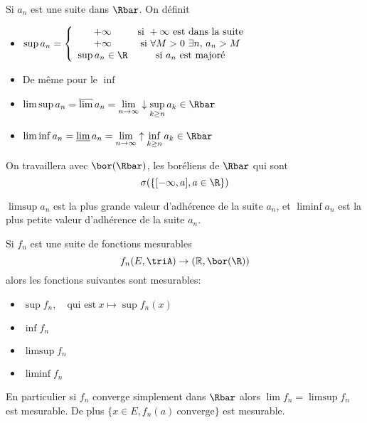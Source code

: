 \begin{definition}
	Si $a_n$ est une suite dans $\Rbar$. On définit
	\begin{itemize}
		\item $\sup a_n =
			      \left\{ \begin{array}{cc}
				      +\infty         & \text{si} \ +\infty \ \text{est dans la suite}   \\
				      +\infty         & \text{si} \ \forall M > 0 \ \exists n,\, a_n > M \\
				      \sup a_n \in \R & \text{si} \ a_n\  \text{est majoré}
			      \end{array}\right.$

		\item De même pour le $\inf$
		\item $\limsup a_n = \varlimsup a_n = \lim\limits_{n \to \infty}\downarrow \sup\limits_{k \geq n } a_k \in \Rbar$
		\item $\liminf a_n = \varliminf a_n = \lim\limits_{n \to \infty}\uparrow \inf\limits_{k \geq n } a_k \in \Rbar$
	\end{itemize}
\end{definition}


\begin{remarque}
	On travaillera avec $\bor(\Rbar)$, les boréliens de $\Rbar$ qui sont
	$$\sigma (\left\{[-\infty, a], a \in \R\right\})$$
\end{remarque}


\begin{remarque}
	$\limsup a_n$ est la plus grande valeur d'adhérence de la suite $a_n$, et
	$\liminf a_n$ est la plus petite valeur d'adhérence de la suite $a_n$.
\end{remarque}

\begin{prop}
	Si $f_n$ est une suite de fonctions mesurables
	$$f_n (E,\triA) \rightarrow (\mathbb{R},\bor(\R))$$
	alors les fonctions suivantes sont mesurables:
	\begin{itemize}
		\item $\sup f_n, \quad \text{qui est} \ x\mapsto \sup f_n(x) $
		\item $\inf f_n$
		\item $\limsup f_n$
		\item $\liminf f_n$
	\end{itemize}
	En particulier si $f_n$ converge simplement dans $\Rbar$ alors
	$\lim f_n = \limsup f_n$ est mesurable. De plus $\{ x \in E, f_n(a) \ \text{converge}\}$ est mesurable.
\end{prop}


